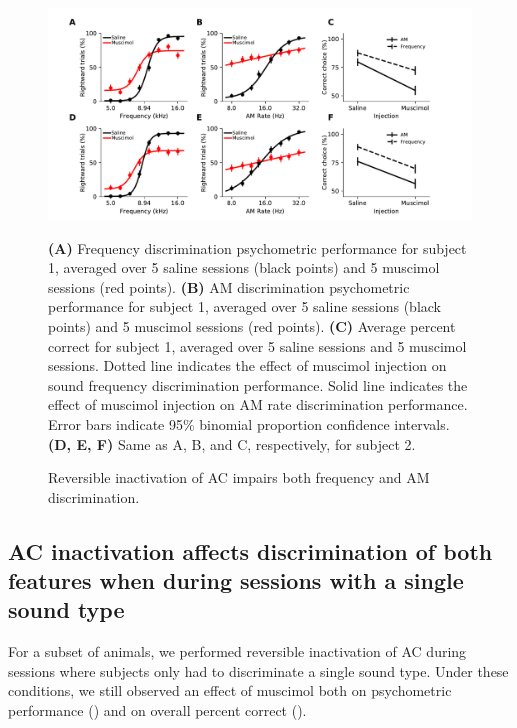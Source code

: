 \begin{figure}[hp] \begin{center}
	\includegraphics[width=6in]{figures/chapter4/figure_main_amod_effect}%
\end{center} \caption{Reversible inactivation of AC impairs both frequency and
AM discrimination.}{ \textbf{(A)} Frequency discrimination psychometric
performance for subject 1, averaged over 5 saline sessions (black points) and 5
muscimol sessions (red points).
%
\textbf{(B)} AM discrimination psychometric performance for subject 1, averaged
over 5 saline sessions (black points) and 5 muscimol sessions (red points). 
%
\textbf{(C)} Average percent correct for subject 1, averaged over 5 saline
sessions and 5 muscimol sessions.
%
Dotted line indicates the effect of muscimol injection on sound frequency
discrimination performance. 
%
Solid line indicates the effect of muscimol injection on AM rate discrimination
performance.
%
Error bars indicate 95\% binomial proportion confidence intervals.
%
\textbf{(D, E, F)} Same as A, B, and C, respectively, for subject 2.  }
\end{figure}


\subsection{AC inactivation affects discrimination of both features when during
sessions with a single sound type}
For a subset of animals, we performed reversible inactivation of AC during
sessions where subjects only had to discriminate a single sound type.
%
Under these conditions, we still observed an effect of muscimol both on
psychometric performance (\textbf{\fig{\SinglePsy}}) and on overall percent
correct (\textbf{\fig{\SingleSum}}).

